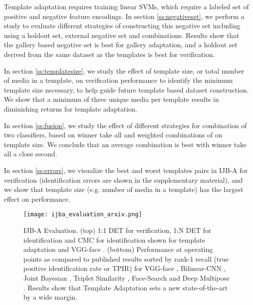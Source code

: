 \documentclass[10pt,twocolumn,letterpaper]{article}
\theoremstyle{definition}		\newtheorem{defn}[thm]{Definition}
\newcommand{\figwidth}{6.85in}
\newcommand{\ARXIV}{}
\begin{document}
  Template adaptation requires training linear SVMs, which require a labeled set of positive and negative feature encodings.  In section \ref{ss:negativeset}, we perform a study to evaluate different strategies of constructing this negative set including using a holdout set, external negative set and combinations. Results show that the gallery based negative set is best for gallery adaptation, and a holdout set derived from the same dataset as the templates is best for verification.  
\smallskip

  In section \ref{ss:templatesize}, we study the effect of template size, or total number of media in a template, on verification performance to identify the minimum template size necessary, to help guide future template based dataset construction.  We show that a minimum of three unique media per template results in diminishing returns for template adaptation.  
\smallskip

  In section \ref{ss:fusion}, we study the effect of different strategies for combination of two classifiers, based on winner take all and weighted combinations of on template size. We conclude that an average combination is best with winner take all a close second.  


  In section \ref{ss:errors}, we visualize the best and worst templates pairs in IJB-A for verification (identification errors are shown in the supplementary material), and we show that template size (e.g. number of media in a template) has the largest effect on performance.  
\smallskip




\ifdefined\ARXIV
\begin{figure*}[t]
\begin{centering}
\texttt{[image: ijba\_evaluation\_arxiv.png]} 
\caption{IJB-A Evaluation.  (top) 1:1 DET for verification, 1:N DET for identification and CMC for identification shown for template adaptation and VGG-face \cite{Parkhi15}.  (bottom) Performance at operating points as compared to published results sorted by rank-1 recall (true positive identification rate or TPIR) for VGG-face \cite{Parkhi15}, Bilinear-CNN \cite{RoyChowdry16}, Joint Bayesian \cite{Sankaranarayanan16}, Triplet Similarity \cite{Chen16}, Face-Search \cite{Wang15} and Deep Multipose \cite{AbdAlmageed16}.  Results show that Template Adaptation sets a new state-of-the-art by a wide margin.}
\label{f:ijba_evaluation}
\end{centering}
\end{figure*}
 \fi
\end{document}
